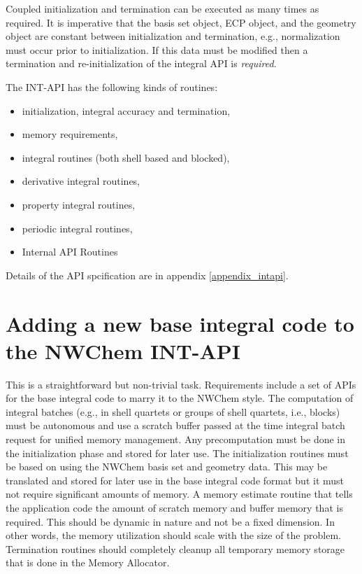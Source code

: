 Coupled initialization and termination can be executed as many times 
as required. It is imperative that the basis set object, ECP object, 
and the geometry object are constant between initialization and 
termination, e.g., normalization must occur prior to initialization. 
If this data must be modified then a termination and re-initialization 
of the integral API is {\it required}. 
 
The INT-API has the following kinds of routines: 
\begin{itemize} 
\item initialization, integral accuracy and termination, 
\item memory requirements, 
\item integral routines (both shell based and blocked), 
\item derivative integral routines, 
\item property integral routines, 
\item periodic integral routines, 
\item Internal API Routines 
\end{itemize} 
 
Details of the API spcification are in appendix \ref{appendix_intapi}. 
 
\section{Adding a new base integral code to the NWChem INT-API} 
 
This is a straightforward but non-trivial task.  Requirements include 
a set of APIs for the base integral code to marry it to the NWChem 
style.  The computation of integral batches (e.g., in shell quartets 
or groups of shell quartets, i.e., blocks) must be autonomous and use 
a scratch buffer passed at the time integral batch request for unified 
memory management.  Any precomputation must be done in the 
initialization phase and stored for later use.  The initialization 
routines must be based on using the NWChem basis set and geometry data. 
This may be translated and stored for later use in the base integral 
code format but it must not require significant amounts of memory.  A 
memory estimate routine that tells the application code the amount of 
scratch memory and buffer memory that is required.  This should be 
dynamic in nature and not be a fixed dimension.  In other words, the 
memory utilization should scale with the size of the problem. 
Termination routines should completely cleanup all temporary memory 
storage that is done in the Memory Allocator.   
 
